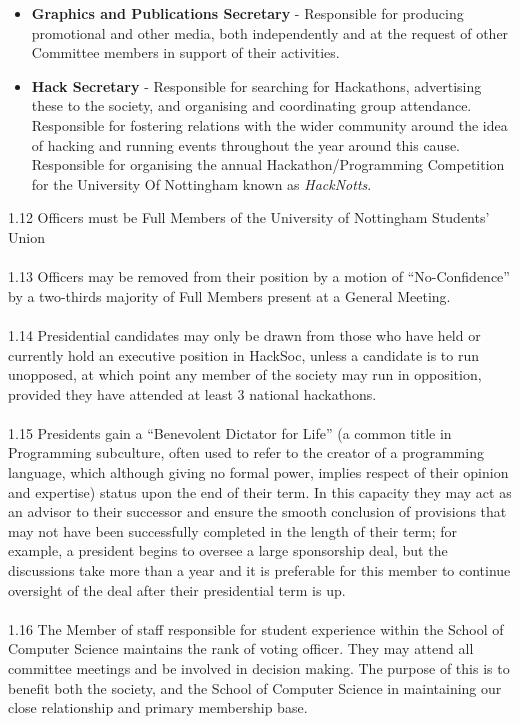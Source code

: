 \documentclass[a4paper,twoside,notitlepage,11pt]{article}
\begin{document}
\begin{itemize}
	\item \textbf{Graphics and Publications Secretary} - Responsible for producing promotional and other media, both independently and at the request of other Committee members in support of their activities.
	\item \textbf{Hack Secretary} - Responsible for searching for Hackathons, advertising these to the society, and organising and coordinating group attendance. Responsible for fostering relations with the wider community around the idea of hacking and running events throughout the year around this cause. Responsible for organising the annual Hackathon/Programming Competition for the University Of Nottingham known as {\it HackNotts}.

\end{itemize}
1.12 Officers must be Full Members of the University of Nottingham Students' Union\ \\
\ \\
1.13 Officers may be removed from their position by a motion of ``No-Confidence'' by a two-thirds majority of Full Members present at a General Meeting.\ \\
\ \\
1.14 Presidential candidates may only be drawn from those who have held or currently hold an executive position in HackSoc, unless a candidate is to run unopposed, at which point any member of the society may run in opposition, provided they have attended at least 3 national hackathons.\ \\
\ \\
1.15 Presidents gain a ``Benevolent Dictator for Life'' (a common title in Programming subculture, often used to refer to the creator of a programming language, which although giving no formal power, implies respect of their opinion and expertise) status upon the end of their term. In this capacity they may act as an advisor to their successor and ensure the smooth conclusion of provisions that may not have been successfully completed in the length of their term; for example, a president begins to oversee a large sponsorship deal, but the discussions take more than a year and it is preferable for this member to continue oversight of the deal after their presidential term is up.\ \\
\ \\
1.16 The Member of staff responsible for student experience within the School of Computer Science maintains the rank of voting officer. They may attend all committee meetings and be involved in decision making. The purpose of this is to benefit both the society, and the School of Computer Science in maintaining our close relationship and primary membership base.\ \\
\end{document}
